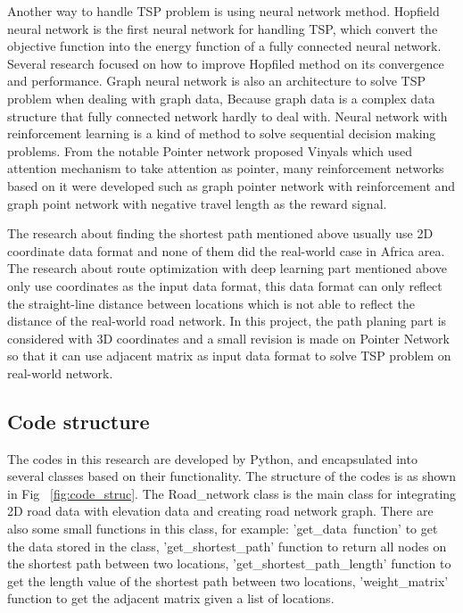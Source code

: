 \documentclass[final-report]{report-template}
\begin{document}
Another way to handle TSP problem is using neural network method\cite{SHI2022681}.
Hopfield neural network\cite{Hopfield:1985aa} is the first neural network for handling TSP, 
which convert the objective function into the energy function of a fully connected neural network.
Several research focused on how to improve Hopfiled method on its convergence\cite{Luo2019DesignAI} and performance\cite{10.1007/s00521-018-3535-9}\cite{improv_hop}.
Graph neural network is also an architecture to solve TSP problem\cite{graph_neural} when dealing with graph data, 
Because graph data is a complex data structure that fully connected network hardly to deal with.
Neural network with reinforcement learning\cite{vanOtterlo2012} is a kind of method to solve sequential decision making problems.
From the notable Pointer network proposed Vinyals\cite{vinyals2017pointer} which used attention mechanism to take attention as pointer, 
many reinforcement networks based on it were developed such as graph pointer network with reinforcement\cite{ma2019combinatorial} 
and graph point network with negative travel length as the reward signal\cite{bello2017neural}.

The research about finding the shortest path mentioned above usually use 2D coordinate data format and none of them did the real-world case in Africa area.
The research about route optimization with deep learning part mentioned above only use coordinates as the input data format, 
this data format can only reflect the straight-line distance between locations which is not able to reflect the distance of the real-world road network.
In this project, the path planing part is considered with 3D coordinates 
and a small revision is made on Pointer Network so that it can use adjacent matrix as input data format to solve TSP problem on real-world network.

\subsection{Code structure}
The codes in this research are developed by Python, and encapsulated into several classes based on their functionality.
The structure of the codes is as shown in Fig~ \ref{fig:code_struc}.
The Road\_network class is the main class for integrating 2D road data with elevation data and creating road network graph.
There are also some small functions in this class, 
for example: 'get\_data\ function' to get the data stored in the class, 
'get\_shortest\_path' function to return all nodes on the shortest path between two locations,
'get\_shortest\_path\_length' function to get the length value of the shortest path between two locations,
'weight\_matrix' function to get the adjacent matrix given a list of locations. 
\end{document}
